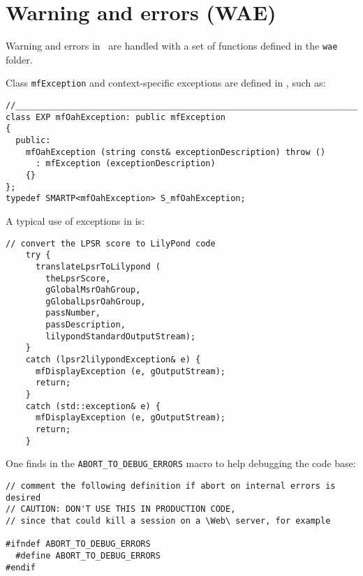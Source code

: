 
\chapter{Warning and errors (WAE)}


Warning and errors in \mf\ are handled with a set of functions defined in the {\tt wae} folder.

Class {\tt mfException} and context-specific exceptions are defined in , such as:
\begin{lstlisting}[language=CPlusPlus]
//______________________________________________________________________________
class EXP mfOahException: public mfException
{
  public:
    mfOahException (string const& exceptionDescription) throw ()
      : mfException (exceptionDescription)
    {}
};
typedef SMARTP<mfOahException> S_mfOahException;
\end{lstlisting}

A typical use of exceptions in  is:
\begin{lstlisting}[language=CPlusPlus]
    // convert the LPSR score to LilyPond code
    try {
      translateLpsrToLilypond (
        theLpsrScore,
        gGlobalMsrOahGroup,
        gGlobalLpsrOahGroup,
        passNumber,
        passDescription,
        lilypondStandardOutputStream);
    }
    catch (lpsr2lilypondException& e) {
      mfDisplayException (e, gOutputStream);
      return;
    }
    catch (std::exception& e) {
      mfDisplayException (e, gOutputStream);
      return;
    }
\end{lstlisting}


One finds in  the {\tt ABORT_TO_DEBUG_ERRORS} macro to help debugging the code base:
\begin{lstlisting}[language=CPlusPlus]
// comment the following definition if abort on internal errors is desired
// CAUTION: DON'T USE THIS IN PRODUCTION CODE,
// since that could kill a session on a \Web\ server, for example

#ifndef ABORT_TO_DEBUG_ERRORS
  #define ABORT_TO_DEBUG_ERRORS
#endif
\end{lstlisting}
